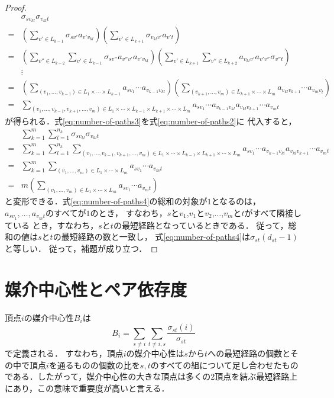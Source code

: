 \begin{proof}
\begin{align}
    &\sigma_{sv_{kl}}\sigma_{v_{kl}t}\nonumber\\
    =&\left(\sum_{v'\in L_{k-1}}\sigma_{sv'}a_{v'v_{kl}}\right)
    \left(\sum_{v'\in L_{k+1}}\sigma_{v_{kl}v'}a_{v't}\right)
    \nonumber\\
    =&\left(\sum_{v''\in L_{k-2}}\sum_{v'\in L_{k-1}}
    \sigma_{sv''}a_{v''v'}a_{v'v_{kl}}\right)
    \left(\sum_{v'\in L_{k+1}}\sum_{v''\in L_{k+2}}
    a_{v_{kl}v'}a_{v'v''}\sigma_{v''t}\right)
    \nonumber\\
    &\vdots\nonumber\\
    =&\left(\sum_{(v_1,\ldots,v_{k-1})\in L_1\times\cdots\times L_{k-1}}
    a_{sv_1}\cdots a_{v_{k-1}v_{kl}}\right)
    \left(\sum_{(v_{k+1},\ldots,v_m)\in L_{k+1}\times\cdots\times L_m}
    a_{v_{kl}v_{k+1}}\cdots a_{v_mv_t}\right)\nonumber\\
    =&\sum_{(v_1,\ldots,v_{k-1},v_{k+1},\ldots,v_m)\in L_1\times\cdots\times L_{k-1}\times L_{k+1}\times\cdots\times L_m}
    a_{sv_1}\cdots a_{v_{k-1}v_{kl}}a_{v_{kl}v_{k+1}}\cdots a_{v_mt}
    \label{eq:number-of-paths3}
  \end{align}
  が得られる．式\eqref{eq:number-of-paths3}を式\eqref{eq:number-of-paths2}に
  代入すると，
  \begin{align}
    &\sum_{k=1}^m\sum_{l=1}^{n_k}\sigma_{sv_{kl}}\sigma_{v_{kl}t}\nonumber\\
    =&\sum_{k=1}^m\sum_{l=1}^{n_k}\sum_{
      (v_1,\ldots,v_{k-1},v_{k+1},\ldots,v_m)\in
      L_1\times\cdots\times L_{k-1}\times L_{k+1}\times\cdots\times L_m
    }a_{sv_1}\cdots a_{v_{k-1}v_{kl}}a_{v_{kl}v_{k+1}}\cdots a_{v_mt}\nonumber\\
    =&\sum_{k=1}^m\sum_{(v_1,\ldots,v_m)\in L_1\times\cdots\times L_m}
    a_{sv_1}\cdots a_{v_mt}\nonumber\\
    =&m\left(\sum_{(v_1,\ldots,v_m)\in L_1\times\cdots\times L_m}
    a_{sv_1}\cdots a_{v_mt}\right)
    \label{eq:number-of-paths4}
  \end{align}
  と変形できる．式\eqref{eq:number-of-paths4}の総和の対象が$1$となるのは，
  $a_{sv_1},\ldots,a_{v_mt}$のすべてが$1$のとき，
  すなわち，$s$と$v_1$,$v_1$と$v_2$,$\ldots$,$v_m$と$t$がすべて隣接している
  とき，すなわち，$s$と$t$の最短経路となっているときである．
  従って，総和の値は$s$と$t$の最短経路の数と一致し，
  式\eqref{eq:number-of-paths4}は$\sigma_{st}(d_{st}-1)$と等しい．
  従って，補題が成り立つ．
\end{proof}

\section{媒介中心性とペア依存度}
頂点$i$の媒介中心性$B_i$は
\begin{equation}
  B_i=\sum_{s\neq i}\sum_{t\neq {i,s}}\frac{\sigma_{st}(i)}{\sigma_{st}}
  \label{eq:betweenness-centrality}
\end{equation}
で定義される\cite{Freeman1977}．
すなわち，頂点$i$の媒介中心性は$s$から$t$への最短経路の個数とその中で頂点$i$を通るものの個数の比を$s,t$のすべての組について足し合わせたものである．したがって，媒介中心性の大きな頂点は多くの2頂点を結ぶ最短経路上にあり，この意味で重要度が高いと言える．

